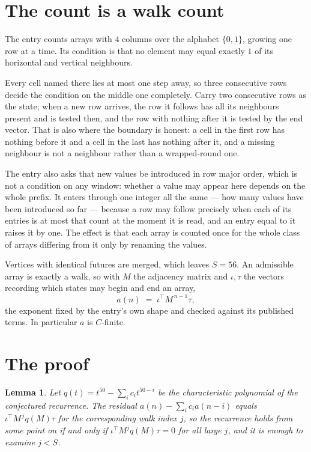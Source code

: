 \documentclass[11pt,a4paper]{article}
\theoremstyle{plain}
\newtheorem{lemma}[theorem]{Lemma}
\theoremstyle{definition}
\begin{document}
\section{The count is a walk count}

The entry counts arrays with $4$ columns over the alphabet $\{0,1\}$, growing one row at a time. Its condition is that no element may equal exactly $1$ of its horizontal and vertical neighbours.

Every cell named there lies at most one step away, so three consecutive rows decide the condition on the middle one completely. Carry two consecutive rows as the state; when a new row arrives, the row it follows has all its neighbours present and is tested then, and the row with nothing after it is tested by the end vector. That is also where the boundary is honest: a cell in the first row has nothing before it and a cell in the last has nothing after it, and a missing neighbour is not a neighbour rather than a wrapped-round one.

The entry also asks that new values be introduced in row major order, which is not a condition on any window: whether a value may appear here depends on the whole prefix. It enters through one integer all the same --- how many values have been introduced so far --- because a row may follow precisely when each of its entries is at most that count at the moment it is read, and an entry equal to it raises it by one. The effect is that each array is counted once for the whole class of arrays differing from it only by renaming the values.

Vertices with identical futures are merged, which leaves $S=56$. An admissible array is exactly a walk, so with $M$ the adjacency matrix and $\iota,\tau$ the vectors recording which states may begin and end an array,
\[
a(n)\;=\;\iota^{\!\top}M^{\,n-1}\tau ,
\]
the exponent fixed by the entry's own shape and checked against its published terms. In
particular $a$ is $C$-finite.

\section{The proof}

\begin{lemma}\label{lem:crit}
Let $q(t)=t^{50}-\sum_i c_it^{50-i}$ be the characteristic polynomial of the
conjectured recurrence. The residual $a(n)-\sum_ic_ia(n-i)$ equals
$\iota^{\!\top}M^{\,j}q(M)\tau$ for the corresponding walk index $j$, so the recurrence
holds from some point on if and only if $\iota^{\!\top}M^{j}q(M)\tau=0$ for all large $j$,
and it is enough to examine $j<S$.
\end{lemma}
\end{document}
